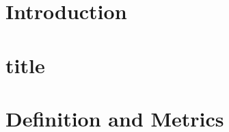 \documentclass{article}
\begin{document}
    \begin{abstract}
        
    \end{abstract}
    
    \section*{Introduction}
    \section{title}
    \section{Definition and Metrics}
    
\end{document}
